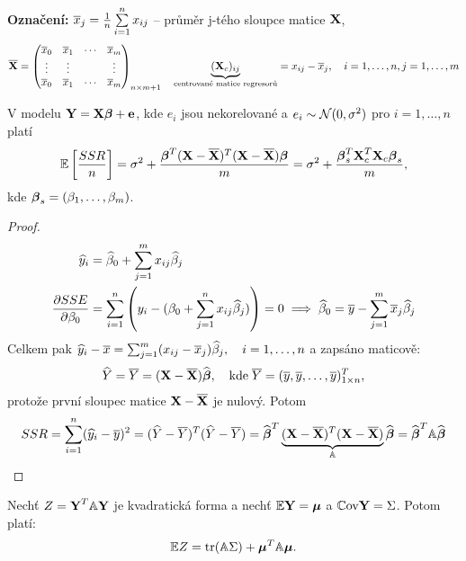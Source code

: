 \textbf{Označení:} $\lx_j = \frac{1}{n} \sumin x_{ij}$ -- průměr j-tého sloupce matice $\X$,
$$
	\lX = \begin{pmatrix}
	\lx_0 & \lx_1 & \cdots & \lx_m \\
	\vdots & \vdots & & \vdots \\
	\lx_0 & \lx_1 & \cdots & \lx_m
	\end{pmatrix}_{n \times m+1} \quad \underbrace{(\X_c)_{ij}}_{\text{centrované matice regresorů}} = x_{ij} - \lx_j, \quad i = 1, \dots, n, j = 1, \dots, m
$$

\begin{theorem}
	V modelu $\Y = \X \betab + \eb$, kde $e_i$ jsou nekorelované a $e_i \sim \Nn$ pro $i = 1, \dots, n$ platí
	$$
		\E \left[ \frac{SSR}{n} \right] = \sigma^2 + \frac{\betab^T(\X - \lX)^T(\X - \lX) \betab}{m} = \sigma^2 + \frac{\betab_s^T \X_c^T \X_c \betab_s}{m},
	$$
	kde $\betab_s = (\beta_1, \dots, \beta_m)$.
\end{theorem}

\begin{proof}
	
\begin{align*}
	\hyi & = \wbeta_0 + \sumjm x_{ij} \wbeta_j \\
	\frac{\partial SSE}{\partial \beta_0} & = \sumin \left( y_i - (\beta_0 + \sumjn x_{ij} \wbeta_j) \right) = 0 \implies \wbeta_0 = \ly - \sumjm \lx_j \wbeta_j
\end{align*}
Celkem pak $\hy_i - \lx = \sumjm (x_{ij} - \lx_j) \wbeta_j, \quad i = 1, \dots, n$ a zapsáno maticově: 
$$
\hY = \lY = (\X - \lX) \wbetab, \quad \text{kde} \; \lY = (\ly, \ly, \dots, \ly)_{1 \times n}^T,
$$
protože první sloupec matice $\X - \lX$ je nulový. Potom
$$
SSR = \sumin(\hy_i - \ly)^2 = (\hY - \lY)^T(\hY - \lY) = \wbetab^T \underbrace{(\X - \lX)^T(\X - \lX)}_{\Am} \wbetab = \wbetab^T \Am \wbetab
$$

\end{proof}

\begin{theorem}
	Nechť $Z = \Y^T \Am \Y$ je kvadratická forma a nechť $\E \Y = \bmu$ a $\Cov \Y = \Sigma$. Potom platí:
	$$
		\E Z = \trace(\Am \Sigma) + \bmu^T \Am \bmu.
	$$
\end{theorem}

